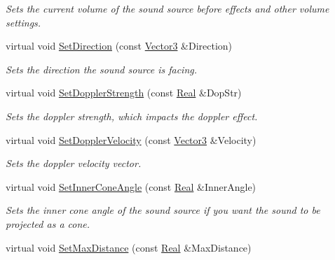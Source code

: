 \begin{DoxyCompactItemize}
\begin{DoxyCompactList}\small\item\em Sets the current volume of the sound source before effects and other volume settings. \item\end{DoxyCompactList}\item 
virtual void \hyperlink{classMezzanine_1_1Audio_1_1Sound_ab1ce22cea03635eccdc50a7c685137c5}{SetDirection} (const \hyperlink{classMezzanine_1_1Vector3}{Vector3} \&Direction)
\begin{DoxyCompactList}\small\item\em Sets the direction the sound source is facing. \item\end{DoxyCompactList}\item 
virtual void \hyperlink{classMezzanine_1_1Audio_1_1Sound_a1e3cf13e3ca46410356872ee23f2d526}{SetDopplerStrength} (const \hyperlink{namespaceMezzanine_a726731b1a7df72bf3583e4a97282c6f6}{Real} \&DopStr)
\begin{DoxyCompactList}\small\item\em Sets the doppler strength, which impacts the doppler effect. \item\end{DoxyCompactList}\item 
virtual void \hyperlink{classMezzanine_1_1Audio_1_1Sound_aa14440b5281f08d50be12aa7c90a97d2}{SetDopplerVelocity} (const \hyperlink{classMezzanine_1_1Vector3}{Vector3} \&Velocity)
\begin{DoxyCompactList}\small\item\em Sets the doppler velocity vector. \item\end{DoxyCompactList}\item 
virtual void \hyperlink{classMezzanine_1_1Audio_1_1Sound_a23599ad48da5e5d2dbc2a194c12d2cda}{SetInnerConeAngle} (const \hyperlink{namespaceMezzanine_a726731b1a7df72bf3583e4a97282c6f6}{Real} \&InnerAngle)
\begin{DoxyCompactList}\small\item\em Sets the inner cone angle of the sound source if you want the sound to be projected as a cone. \item\end{DoxyCompactList}\item 
virtual void \hyperlink{classMezzanine_1_1Audio_1_1Sound_a77de9e890d539b951b915437f160b4c6}{SetMaxDistance} (const \hyperlink{namespaceMezzanine_a726731b1a7df72bf3583e4a97282c6f6}{Real} \&MaxDistance)

\end{DoxyCompactItemize}
